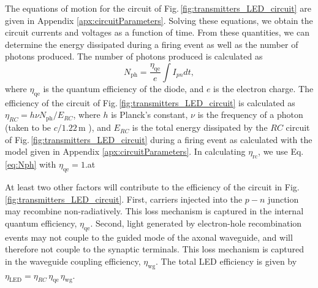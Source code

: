 \documentclass[aip,amsmath,amssymb,reprint,nofootinbib]{revtex4-1}
\begin{document}
The equations of motion for the circuit of Fig.\,\ref{fig:transmitters_LED_circuit} are given in Appendix \ref{apx:circuitParameters}. Solving these equations, we obtain the circuit currents and voltages as a function of time. From these quantities, we can determine the energy dissipated during a firing event as well as the number of photons produced. The number of photons produced is calculated as 
\begin{equation}
\label{eq:Nph}
N_{\mathrm{ph}} = \frac{\eta_{\mathrm{qe}}}{e}\int I_{pn} dt, 
\end{equation}
where $\eta_{\mathrm{qe}}$ is the quantum efficiency of the diode, and $e$ is the electron charge. The efficiency of the circuit of Fig.\,\ref{fig:transmitters_LED_circuit} is calculated as $
\eta_{RC} = h \nu N_{\mathrm{ph}} / E_{RC}$, where $h$ is Planck's constant, $\nu$ is the frequency of a photon (taken to be $c/1.22$\,\textmu m \cite{buch2017}), and $E_{RC}$ is the total energy dissipated by the $RC$ circuit of Fig.\,\ref{fig:transmitters_LED_circuit} during a firing event as calculated with the model given in Appendix \ref{apx:circuitParameters}. In calculating $\eta_{\mathrm{rc}}$, we use Eq.\,\ref{eq:Nph} with $\eta_{\mathrm{qe}} = 1$.at

At least two other factors will contribute to the efficiency of the circuit in Fig.\,\ref{fig:transmitters_LED_circuit}. First, carriers injected into the $p-n$ junction may recombine non-radiatively. This loss mechanism is captured in the internal quantum efficiency, $\eta_{\mathrm{qe}}$. Second, light generated by electron-hole recombination events may not couple to the guided mode of the axonal waveguide, and will therefore not couple to the synaptic terminals. This loss mechanism is captured in the waveguide coupling efficiency, $\eta_{\mathrm{wg}}$. The total LED efficiency is given by $\eta_{\mathrm{LED}} = \eta_{RC}\,\eta_{\mathrm{qe}}\,\eta_{\mathrm{wg}}$.
\end{document}
